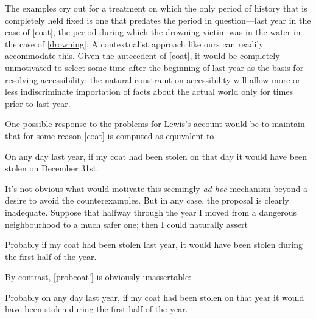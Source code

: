 \documentclass[If.tex]{subfiles}
\begin{document}
\begin{prop}
The examples cry out for a treatment on which the only period of history that is completely held fixed is one that predates the period in question---last year in the case of \ref{coat}, the period during which the drowning victim was in the water in the case of \ref{drowning}. A contextualist approach like ours can readily accommodate this. Given the antecedent of \ref{coat}, it would be completely unmotivated to select some time after the beginning of last year as the basis for resolving accessibility: the natural constraint on accessibility will allow more or less indiscriminate importation of facts about the actual world only for times prior to last year.

One possible response to the problems for Lewis's account would be to maintain that for some reason \ref{coat} is computed as equivalent to
\begin{prop}
	On any day last year, if my coat had been stolen on that day it would have been stolen on December 31st. 
\end{prop}
It's not obvious what would motivate this seemingly \emph{ad hoc} mechanism beyond a desire to avoid the counterexamples. But in any case, the proposal is clearly inadequate. Suppose that halfway through the year I moved from a dangerous neighbourhood to a much safer one; then I could naturally assert
\begin{prop}
	\nitem \label{probcoat}
		Probably if my coat had been stolen last year, it would have been stolen during the first half of the year.
\end{prop}
By contrast, \ref{probcoat'} is obviously unassertable:
\begin{prop}
	 \label{probcoat'} 
	Probably on any day last year, if my coat had been stolen on that year it would have been stolen during the first half of the year.
\end{prop}


\end{prop}
\end{document}
